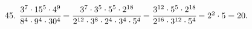 45. $\cfrac{3^7\cdot15^5\cdot4^9}{8^4\cdot9^4\cdot30^4}=\cfrac{3^7\cdot3^5\cdot5^5\cdot2^{18}}{2^{12}\cdot3^8\cdot2^4\cdot3^4\cdot5^4}=
\cfrac{3^{12}\cdot5^5\cdot2^{18}}{2^{16}\cdot3^{12}\cdot5^4}=2^2\cdot5=20.$\\
